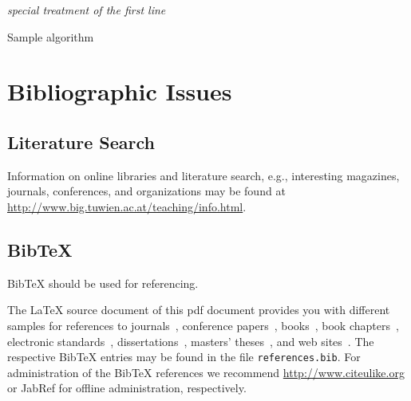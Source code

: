 \documentclass{llncs}
\begin{document}
\begin{algorithm}[t]


\BlankLine

\emph{special treatment of the first line}\;
\caption{Sample algorithm}\label{alg:samplealgorithm}
\end{algorithm}

\section{Bibliographic Issues}

\subsection{Literature Search}

Information on online libraries and literature search, e.g., interesting magazines, journals, conferences, and organizations may be found at \url{http://www.big.tuwien.ac.at/teaching/info.html}.

\subsection{BibTeX}

BibTeX should be used for referencing.

The LaTeX source document of this pdf document provides you with different samples for references to journals~\cite{jour:B2BServices}, conference papers~\cite{proc:TheWebMLApproach}, books~\cite{book:umlatwork}, book chapters~\cite{incoll:ErhardKonrad1992}, electronic standards~\cite{man:BPEL}, dissertations~\cite{phdthesis:manuelWimmer}, masters' theses~\cite{mast:AUMLProfile}, and web sites~\cite{misc:BIGWebsite}. The respective BibTeX entries may be found in the file \texttt{references.bib}. For administration of the BibTeX references we recommend \url{http://www.citeulike.org} or JabRef for offline administration, respectively.



\end{document}
